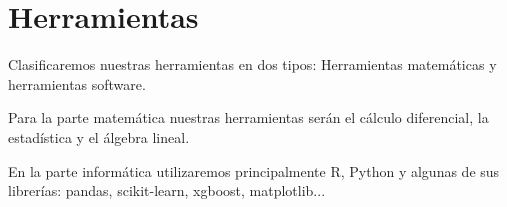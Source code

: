 \section{Herramientas}
Clasificaremos nuestras herramientas en dos tipos: Herramientas matemáticas y herramientas software.  

Para la parte matemática nuestras herramientas serán el cálculo diferencial, la estadística y el álgebra lineal.

En la parte informática utilizaremos principalmente R, Python y algunas de sus librerías: pandas, scikit-learn, xgboost, matplotlib...


